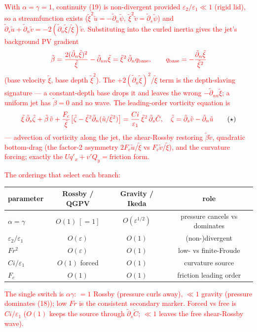 \documentclass[11pt]{article}
\newcommand{\R}[1]{\textcolor{red}{#1}}
\newcommand{\dt}{\tilde{\partial}}
\begin{document}
\R{With $\alpha=\gamma=1$, continuity (19) is non-divergent provided
$\varepsilon_2/\varepsilon_1\ll1$ (rigid lid), so a streamfunction exists
($\tilde\xi^2\tilde u=-\dt_n\tilde\psi,\ \tilde\xi^2\tilde v=\dt_s\tilde\psi$) and
$\dt_s\tilde u+\dt_n\tilde v=-2(\dt_n\tilde\xi/\tilde\xi)\tilde v$. Substituting
into the curled inertia gives the jet's background PV gradient}
\begin{equation*}
\R{\tilde\beta=\frac{2(\dt_n\tilde\xi)^2}{\tilde\xi}-\dt_{nn}\tilde\xi
 =\tilde\xi^2\,\dt_n q_{\mathrm{base}},\qquad
 q_{\mathrm{base}}=-\frac{\dt_n\tilde\xi}{\tilde\xi^2}}
\end{equation*}
\R{(base velocity $\tilde\xi$, base depth $\tilde\xi^2$). The
$+2(\dt_n\tilde\xi)^2/\tilde\xi$ term is the depth-slaving signature --- a
constant-depth base drops it and leaves the wrong $-\dt_{nn}\tilde\xi$; a uniform
jet has $\tilde\beta=0$ and no wave. The leading-order vorticity equation is}
\begin{equation*}
\R{\tilde\xi\,\dt_s\tilde\zeta+\tilde\beta\,\tilde v
 +\frac{F_c}{\tilde\xi}\big[\tilde\zeta-\tilde\xi^2\dt_n(\tilde u/\tilde\xi^2)\big]
 =\frac{Ci}{\varepsilon_1}\,\tilde\xi^2\,\dt_s\tilde C ,\quad
 \tilde\zeta=\dt_s\tilde v-\dt_n\tilde u }\tag{$\star$}
\end{equation*}
\R{--- advection of vorticity along the jet, the shear-Rossby restoring
$\tilde\beta\tilde v$, quadratic bottom-drag (the factor-2 asymmetry
$2F_c\tilde u/\tilde\xi$ vs $F_c\tilde v/\tilde\xi$), and the curvature forcing;
exactly the $U q'_x+v'Q_y=\text{friction}$ form.}

\R{The orderings that select each branch:}
\begin{center}\small\color{red}
\begin{tabular}{lccc}
parameter & Rossby / QGPV & Gravity / Ikeda & role\\
\hline
$\alpha=\gamma$ & $O(1)\ [{=}1]$ & $O(\varepsilon^{1/2})$ & pressure cancels vs dominates\\
$\varepsilon_2/\varepsilon_1$ & $O(\varepsilon)$ & $O(1)$ & (non-)divergent\\
$Fr^2$ & $O(\varepsilon)$ & $O(1)$ & low- vs finite-Froude\\
$Ci/\varepsilon_1$ & $O(1)$ forced & $O(1)$ & curvature source\\
$F_c$ & $O(1)$ & $O(1)$ & friction leading order\\
\end{tabular}
\end{center}
\R{The single switch is $\alpha\gamma$: $=1$ Rossby (pressure curls away), $\ll1$
gravity (pressure dominates (18)); low $Fr$ is the consistent secondary marker.
Forced vs free is $Ci/\varepsilon_1$ ($O(1)$ keeps the source through
$\dt_s\tilde C$; $\ll1$ leaves the free shear-Rossby wave).}
\end{document}
